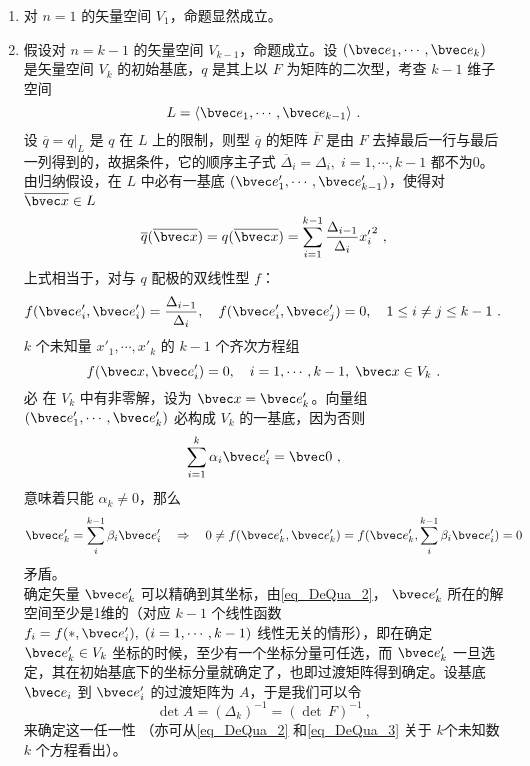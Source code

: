 \begin{enumerate}
\item 对 $n=1$ 的矢量空间 $V_1$，命题显然成立。
\item 假设对 $n=k-1$ 的矢量空间 $V_{k-1}$，命题成立。设 $(\bvec e_1,\cdots,\bvec e_k)$ 是矢量空间 $V_k$ 的初始基底，$q$ 是其上以 $F$ 为矩阵的二次型，考查 $k-1$ 维子空间
\begin{equation}
L=\langle\bvec e_1,\cdots,\bvec e_{k-1}\rangle~.
\end{equation}
设 $\overline q=q|_L$ 是 $q$ 在 $L$ 上的限制，则型 $\overline q$ 的矩阵 $\overline F$ 是由 $F$ 去掉最后一行与最后一列得到的，故据条件，它的顺序主子式 $\overline\Delta_i=\Delta_i,\;i=1,\cdots,k-1$ 都不为0。由归纳假设，在 $L$ 中必有一基底 $(\bvec e'_1,\cdots,\bvec e'_{k-1})$，使得对 $\overline{\bvec x}\in L$
\begin{equation}
\overline q(\overline{\bvec x})=q(\overline{\bvec x})=\sum_{i=1}^{k-1}\frac{\Delta_{i-1}}{\Delta_i}{x'_{i}}^2~,
\end{equation}
上式相当于，对与 $q$ 配极的双线性型 $f$：
\begin{equation}
f(\bvec e'_i,\bvec e'_i)=\frac{\Delta_{i-1}}{\Delta_{i}},\quad f(\bvec e'_i,\bvec e'_j)=0,\quad 1\leq i\neq j\leq k-1~.
\end{equation}
 $k$ 个未知量 $x'_1,\cdots,x'_k$ 的 $k-1$ 个齐次方程组
 \begin{equation}\label{eq_DeQua_2}
 f(\bvec x,\bvec e'_i)=0,\quad i=1,\cdots,k-1,\;\bvec x\in V_k~.
 \end{equation}
 必 在 $V_k$ 中有非零解，设为 $\bvec x=\bvec e'_k$。向量组 $(\bvec e'_1,\cdots,\bvec e'_k)$ 必构成 $V_k$ 的一基底，因为否则
 \begin{equation}
 \sum_{i=1}^k\alpha_i\bvec e'_i=\bvec 0~,
 \end{equation}
 意味着只能 $\alpha_k\neq0$，那么 
 \begin{equation}
 \bvec e'_k=\sum_i^{k-1}\beta_i\bvec e'_i\quad
 \Rightarrow\quad 0\neq f(\bvec e'_k,\bvec e'_k)=f(\bvec e'_k,\sum_i^{k-1}\beta_i\bvec e'_i)=0~
 \end{equation}
 矛盾。\\

 确定矢量 $\bvec e'_k$ 可以精确到其坐标，由\autoref{eq_DeQua_2}， $\bvec e'_k$ 所在的解空间至少是1维的（对应 $k-1$ 个线性函数 $f_i=f(*,\bvec e'_i),\;(i=1,\cdots,k-1)$ 线性无关的情形），即在确定 $\bvec e'_k\in V_k$ 坐标的时候，至少有一个坐标分量可任选，而 $\bvec e'_k$ 一旦选定，其在初始基底下的坐标分量就确定了，也即过渡矩阵得到确定。设基底 $\bvec e_i$ 到 $\bvec e'_i$ 的过渡矩阵为 $A$，于是我们可以令
 \begin{equation}\label{eq_DeQua_3}
 \det A=(\Delta_k)^{-1}=(\det\,F)^{-1}~,
 \end{equation}
 来确定这一任一性 （亦可从\autoref{eq_DeQua_2} 和\autoref{eq_DeQua_3} 关于 $k$个未知数 $k$ 个方程看出）。


\end{enumerate}
